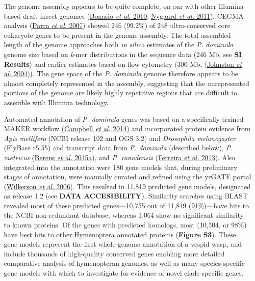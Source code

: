 The genome assembly appears to be quite complete, on par with other
Illumina-based draft insect genomes
(\protect\hyperlink{ux5fENREFux5f5}{Bonasio \textit{et al.} 2010};
\protect\hyperlink{ux5fENREFux5f37}{Nygaard \textit{et al.} 2011}). CEGMA
analysis (\protect\hyperlink{ux5fENREFux5f42}{Parra \textit{et al.} 2007})
showed 246 (99.2\%) of 248 ultra-conserved core eukaryote genes to be
present in the genome assembly. The total assembled length of the genome
approaches both \textit{in silico} estimates of the \textit{P. dominula}
genome size based on \textit{k}-mer distributions in the sequence data
(246 Mb, see \textbf{SI Results}) and earlier estimates based on flow
cytometry (300 Mb, (\protect\hyperlink{ux5fENREFux5f23}{Johnston
\textit{et al.} 2004})). The gene space of the \textit{P. dominula} genome
therefore appears to be almost completely represented in the assembly,
suggesting that the unrepresented portions of the genome are likely
highly repetitive regions that are difficult to assemble with Illumina
technology.

Automated annotation of \textit{P. dominula} genes was based on a
specifically trained MAKER workflow
(\protect\hyperlink{ux5fENREFux5f6}{Campbell \textit{et al.} 2014}) and
incorporated protein evidence from \textit{Apis mellifera} (NCBI release
102 and OGS 3.2) and \textit{Drosophila} \textit{melanogaster} (FlyBase
r5.55) and transcript data from \textit{P. dominula} (described below),
\textit{P. metricus} (\protect\hyperlink{ux5fENREFux5f2}{Berens \textit{et
al.} 2015a}), and \textit{P. canadensis}
(\protect\hyperlink{ux5fENREFux5f10}{Ferreira \textit{et al.} 2013}). Also
integrated into the annotation were 180 gene models that, during
preliminary stages of annotation, were manually curated and refined
using the yrGATE portal (\protect\hyperlink{ux5fENREFux5f73}{Wilkerson
\textit{et al.} 2006}). This resulted in 11,819 predicted gene models,
designated as release 1.2 (see \textbf{DATA ACCESIBILITY}). Similarity
searches using BLAST revealed most of these predicted genes---10,755 out
of 11,819 (91\%)---have hits to the NCBI non-redundant database, whereas
1,064 show no significant similarity to known proteins. Of the genes
with predicted homologs, most (10,504, or 98\%) have best hits to other
Hymenoptera annotated proteins (\textbf{Figure S3}). These gene models
represent the first whole-genome annotation of a vespid wasp, and
include thousands of high-quality conserved genes enabling more detailed
comparative analysis of hymenopteran genomes, as well as many
species-specific gene models with which to investigate for evidence of
novel clade-specific genes.

